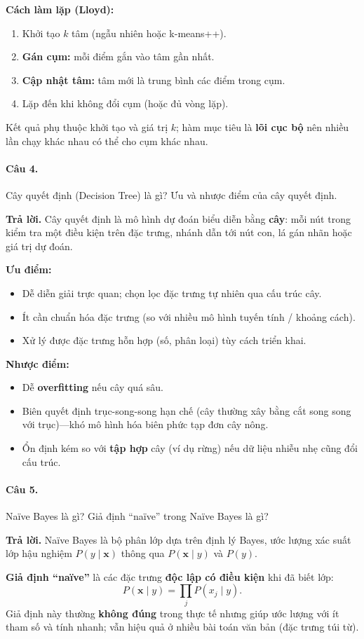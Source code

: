 \textbf{Cách làm lặp (Lloyd):}
\begin{enumerate}[nosep,label=\arabic*.]
\item Khởi tạo $k$ tâm (ngẫu nhiên hoặc k-means++).
\item \textbf{Gán cụm:} mỗi điểm gắn vào tâm gần nhất.
\item \textbf{Cập nhật tâm:} tâm mới là trung bình các điểm trong cụm.
\item Lặp đến khi không đổi cụm (hoặc đủ vòng lặp).
\end{enumerate}
Kết quả phụ thuộc khởi tạo và giá trị $k$; hàm mục tiêu là \textbf{lõi cục bộ} nên nhiều lần chạy khác nhau có thể cho cụm khác nhau.

\paragraph{Câu 4.} Cây quyết định (Decision Tree) là gì? Ưu và nhược điểm của cây quyết định.

\medskip\noindent\textbf{Trả lời.} Cây quyết định là mô hình dự đoán biểu diễn bằng \textbf{cây}: mỗi nút trong kiểm tra một điều kiện trên đặc trưng, nhánh dẫn tới nút con, lá gán nhãn hoặc giá trị dự đoán.

\textbf{Ưu điểm:}
\begin{itemize}[nosep]
\item Dễ diễn giải trực quan; chọn lọc đặc trưng tự nhiên qua cấu trúc cây.
\item Ít cần chuẩn hóa đặc trưng (so với nhiều mô hình tuyến tính / khoảng cách).
\item Xử lý được đặc trưng hỗn hợp (số, phân loại) tùy cách triển khai.
\end{itemize}
\textbf{Nhược điểm:}
\begin{itemize}[nosep]
\item Dễ \textbf{overfitting} nếu cây quá sâu.
\item Biên quyết định trục-song-song hạn chế (cây thường xây bằng cắt song song với trục)---khó mô hình hóa biên phức tạp đơn cây nông.
\item Ổn định kém so với \textbf{tập hợp} cây (ví dụ rừng) nếu dữ liệu nhiễu nhẹ cũng đổi cấu trúc.
\end{itemize}

\paragraph{Câu 5.} Naïve Bayes là gì? Giả định ``naïve'' trong Naïve Bayes là gì?

\medskip\noindent\textbf{Trả lời.} Naïve Bayes là bộ phân lớp dựa trên định lý Bayes, ước lượng xác suất lớp hậu nghiệm $P(y\mid \mathbf{x})$ thông qua $P(\mathbf{x}\mid y)$ và $P(y)$.

\textbf{Giả định ``naïve''} là các đặc trưng \textbf{độc lập có điều kiện} khi đã biết lớp:
\[
P(\mathbf{x}\mid y) = \prod_j P(x_j \mid y).
\]
Giả định này thường \textbf{không đúng} trong thực tế nhưng giúp ước lượng với ít tham số và tính nhanh; vẫn hiệu quả ở nhiều bài toán văn bản (đặc trưng túi từ).
